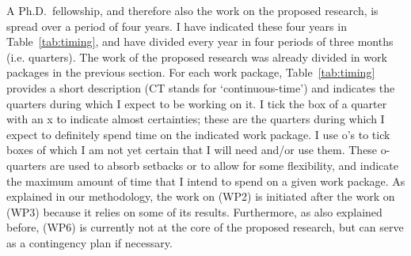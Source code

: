 \documentclass[11pt,dvipsnames,usenames,a4paper]{article}
\begin{document}
\begin{table}[H]
    \caption{Summary and time line of work packages}
    \label{tab:timing}
    \centering
\end{table}

A Ph.D.\ fellowship, and therefore also the work on the proposed research, is spread over a period of four years.
I have indicated these four years in Table~\ref{tab:timing}, and have divided every year in four periods of three months (i.e. quarters).
The work of the proposed research was already divided in work packages in the previous section.
For each work package, Table~\ref{tab:timing} provides a short description (CT stands for `continuous-time') and indicates the quarters during which I expect to be working on it.
I tick the box of a quarter with an x to indicate almost certainties; these are the quarters during which I expect to definitely spend time on the indicated work package.
I use o's to tick boxes of which I am not yet certain that I will need and/or use them.
These o-quarters are used to absorb setbacks or to allow for some flexibility, and indicate the maximum amount of time that I intend to spend on a given work package. As explained in our methodology, the work on (WP2) is initiated after the work on (WP3) because it relies on some of its results. Furthermore, as also explained before, (WP6) is currently not at the core of the proposed research, but can serve as a contingency plan if necessary.
\end{document}

